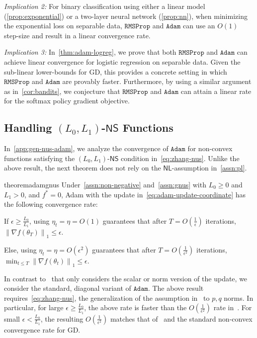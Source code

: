 \documentclass{article}
\newcommand{\norm}[1]{\left\|#1 \right\|}
\newcommand{\etat}{{\eta_t}}
\newcommand{\RMS}{\texttt{RMSProp}}
\newcommand{\Adam}{\texttt{Adam}}
\newcommand{\NS}{\textsf{NS}}
\newcommand{\NL}{\textsf{NL}}
\begin{document}
\textit{Implication 2:} For binary classification using either a linear model (\cref{prop:exponential}) or a two-layer neural network (\cref{prop:nn}), when minimizing the exponential loss on separable data, $\RMS$ and $\Adam$ can use an $O(1)$ step-size and result in a linear convergence rate.

\textit{Implication 3:} In~\cref{thm:adam-logreg}, we prove that both $\RMS$ and $\Adam$ can achieve linear convergence for logistic regression on separable data. Given the sub-linear lower-bounds for GD, this provides a concrete setting in which $\RMS$ and $\Adam$ are provably faster. Furthermore, by using a similar argument as in~\cref{cor:bandits}, we conjecture that $\RMS$ and $\Adam$ can attain a linear rate for the softmax policy gradient objective. 

\subsection{Handling $(L_0, L_1)$-$\NS$ Functions}
\label{sec:gnus}
In~\cref{app:gen-nus-adam}, we analyze the convergence of $\Adam$ for non-convex functions satisfying the $(L_0,L_1)$-$\NS$ condition in~\cref{eq:zhang-nus}. Unlike the above result, the next theorem does not rely on the $\NL$-assumption in~\cref{assn:pl}. 

\begin{restatable}{theorem}{adamgnus}
Under~\cref{assn:non-negative} and~\cref{assn:gnus} with $L_0 \geq 0$ and $L_1 > 0$, and  $f^* = 0$, Adam with the update in~\cref{eq:adam-update-coordinate} has the following convergence rate:  

\hspace{3ex} \textbullet If $\epsilon \geq \frac{L_0}{L_1}$, using $\etat = \eta = O(1)$ guarantees that after $T = O\left(\frac{1}{\epsilon}\right)$ iterations, $\norm{\nabla f(\theta_{T})}_1 \leq \epsilon$. 

\hspace{3ex} \textbullet Else, using $\etat = \eta = O(\epsilon^2)$ guarantees that after $T = O\left(\frac{1}{\epsilon^2} \right)$ iterations, $\min_{t \leq T} \norm{\nabla f(\theta_t)}_1 \leq \epsilon$. 

\label{thm:adam-coordinate-gnus}
\end{restatable}
In contrast to~\citet{wang2024convergence} that only considers the scalar or norm version of the update, we consider the standard, diagonal variant of $\Adam$. The above result requires~\cref{eq:zhang-nus}, the generalization of the assumption in~\citet{zhang2019gradient} to $p, q$ norms. In particular, for large $\epsilon \geq \frac{L_0}{L_1}$, the above rate is faster than the $O\left(\frac{1}{\epsilon^2}\right)$ rate in~\citet[Theorem 1]{wang2024convergence}. For small $\epsilon < \frac{L_0}{L_1}$, the resulting $O\left(\frac{1}{\epsilon^2}\right)$ matches that of~\citet{wang2024convergence} and the standard non-convex convergence rate for GD. 
\end{document}
